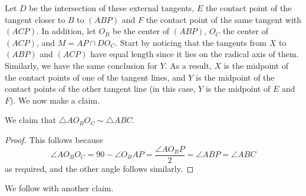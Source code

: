 \documentclass{article}
\begin{document}
Let $D$ be the intersection of these external tangents, $E$ the contact point of the tangent closer to $B$ to $(ABP)$ and $F$ the contact point of the same tangent with $(ACP)$. In addition, let $O_B$ be the center of $(ABP)$, $O_C$ the center of $(ACP)$, and $M = AP \cap DO_C$. Start by noticing that the tangents from $X$ to $(ABP)$ and $(ACP)$ have equal length since it lies on the radical axis of them. Similarly, we have the same conclusion for $Y$. As a result, $X$ is the midpoint of the contact points of one of the tangent lines, and $Y$ is the midpoint of the contact points of the other tangent line (in this case, $Y$ is the midpoint of $E$ and $F$). We now make a claim.

\begin{claim*}
We claim that $\triangle AO_BO_C \sim \triangle ABC$.
\end{claim*}
\begin{proof}
This follows because \[\angle AO_BO_C = 90 - \angle O_BAP = \dfrac{\angle AO_BP}{2} = \angle ABP = \angle ABC\] as required, and the other angle follows similarly.
\end{proof}

We follow with another claim.
\end{document}
